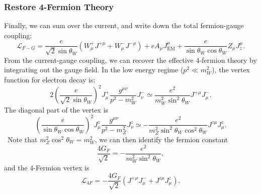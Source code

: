 \subsubsection{Restore 4-Fermion Theory}
Finally, we can sum over the current, and write down the total fermion-gauge coupling:
\begin{equation}
	\mathcal L_{F-G} = \frac{e}{\sqrt{2}\sin{\theta_W}} \left(W^{+}_\mu J^{+\mu} + W^{-}_\mu J^{-\mu} \right) + e A_\mu J^{\mu}_{\mathrm{EM}} + \frac{e}{\sin{\theta_W}\cos{\theta_W}} Z_\mu J^\mu_{z}.
\end{equation}
From the current-gauge coupling, we can recover the effective 4-fermion theory by integrating out the gauge field.
In the low energy regime ($p^2 \ll m_W^2$), the vertex function for electron decay is:
\begin{equation}
	2\left(\frac{e}{\sqrt{2}\sin{\theta_W}} \right)^2 J^+_\mu \frac{g^{\mu\nu}}{p^2-m_W^2} J^-_\nu 
	\simeq \frac{e^2}{m_W^2 \sin^2{\theta_W}} J^{+\mu} J^-_\mu.
\end{equation}
The diagonal part of the vertex is
\begin{equation}
	\left(\frac{e}{\sin{\theta_W}\cos{\theta_W}} \right)^2 J^z_\mu \frac{g^{\mu\nu}}{p^2-m_Z^2} J^z_\nu 
	\simeq -\frac{e^2}{m_Z^2 \sin^2{\theta_W}\cos^2{\theta_W}} J^{z\mu} J^z_\mu.
\end{equation}\
Note that $m_Z^2\cos^2{\theta_W} = m_W^2$, we can then identify the fermion constant
\begin{equation}
	\frac{4G_F}{\sqrt 2} = -\frac{e^2}{m_W^2 \sin^2{\theta_W}},
\end{equation}
and the 4-Fermion vertex is
\begin{equation}
	\mathcal L_{4F} = -\frac{4G_F}{\sqrt 2} \left(J^{+\mu} J_\mu^- + J^{z\mu} J_\mu^z \right).
\end{equation}
















